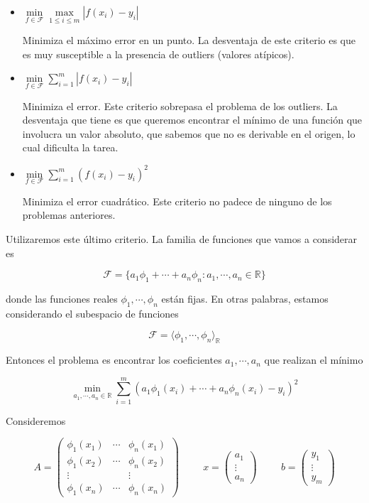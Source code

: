 \begin{itemize}
\item $\min\limits_{f \in \mathcal{F}}\max\limits_{1 \leq i \leq m} |f(x_i) - y_i|$

Minimiza el máximo error en un punto. La desventaja de este criterio es que es muy susceptible a la presencia de outliers (valores atípicos).

\item $\min\limits_{f \in \mathcal{F}} \sum_{i = 1}^m |f(x_i) - y_i|$

Minimiza el error. Este criterio sobrepasa el problema de los outliers. La desventaja que tiene es que queremos encontrar el mínimo de una función que involucra un valor absoluto, que sabemos que no es derivable en el origen, lo cual dificulta la tarea.

\item $\min\limits_{f \in \mathcal{F}} \sum_{i = 1}^m (f(x_i) - y_i)^2$

Minimiza el error cuadrático. Este criterio no padece de ninguno de los problemas anteriores.
\end{itemize}

Utilizaremos este último criterio. La familia de funciones que vamos a considerar es

\[\mathcal{F} = \{a_1 \phi_1 + \cdots + a_n \phi_n : a_1, \cdots, a_n \in \mathbb{R}\}\]

donde las funciones reales $\phi_1, \cdots, \phi_n$ están fijas. En otras palabras, estamos considerando el subespacio de funciones

\[\mathcal{F} = \langle\phi_1, \cdots, \phi_n\rangle_{\mathbb{R}}\]

Entonces el problema es encontrar los coeficientes $a_1, \cdots, a_n$ que realizan el mínimo

\[\min\limits_{a_1, \cdots, a_n \in \mathbb{R}} \sum_{i = 1}^m (a_1 \phi_1(x_i) + \cdots + a_n \phi_n(x_i) - y_i)^2\]

Consideremos

\[A = \begin{pmatrix}
\phi_1(x_1) & \cdots & \phi_n(x_1) \\
\phi_1(x_2) & \cdots & \phi_n(x_2) \\
\vdots		&		&	\vdots		\\
\phi_1(x_n)	& \cdots & \phi_n(x_n)
\end{pmatrix}
\hspace{1cm}
x = \begin{pmatrix}
a_1 \\
\vdots \\
a_n
\end{pmatrix}
\hspace{1cm}
b = \begin{pmatrix}
y_1\\
\vdots\\
y_m
\end{pmatrix}
\]


